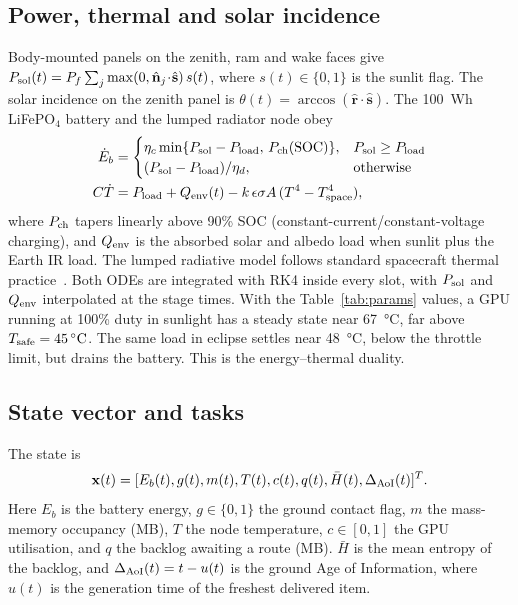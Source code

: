 \documentclass[conference]{IEEEtran}
\theoremstyle{remark}
\begin{document}
\subsection{Power, thermal and solar incidence}
Body-mounted panels on the zenith, ram and wake faces give $P_{\rm sol}(t)=P_f\sum_j\max(0,\hat{\mathbf n}_j\!\cdot\!\hat{\mathbf s})\,s(t)$, where $s(t)\in\{0,1\}$ is the sunlit flag. The solar incidence on the zenith panel is $\theta(t)=\arccos(\hat{\mathbf r}\cdot\hat{\mathbf s})$. The \SI{100}{Wh} LiFePO$_4$ battery and the lumped radiator node obey
\begin{align}
\dot E_b&=\begin{cases}\eta_c\min\{P_{\rm sol}-P_{\rm load},\,P_{\rm ch}(\mathrm{SOC})\}, & P_{\rm sol}\ge P_{\rm load}\\ (P_{\rm sol}-P_{\rm load})/\eta_d, & \text{otherwise}\end{cases}\label{eq:batt}\\
C\dot T&=P_{\rm load}+Q_{\rm env}(t)-k\,\epsilon\sigma A\,(T^4-T_{\rm space}^4),\label{eq:therm}
\end{align}
where $P_{\rm ch}$ tapers linearly above 90\% SOC (constant-current/constant-voltage charging), and $Q_{\rm env}$ is the absorbed solar and albedo load when sunlit plus the Earth IR load. The lumped radiative model follows standard spacecraft thermal practice~\cite{gilmore2002thermal}. Both ODEs are integrated with RK4 inside every slot, with $P_{\rm sol}$ and $Q_{\rm env}$ interpolated at the stage times. With the Table~\ref{tab:params} values, a GPU running at 100\% duty in sunlight has a steady state near \SI{67}{\celsius}, far above $T_{\rm safe}=\SI{45}{\celsius}$. The same load in eclipse settles near \SI{48}{\celsius}, below the throttle limit, but drains the battery. This is the energy--thermal duality.

\subsection{State vector and tasks}
The state is
\begin{equation}
\mathbf{x}(t)=[E_b(t),g(t),m(t),T(t),c(t),q(t),\bar H(t),\Delta_{\rm AoI}(t)]^T.
\end{equation}
Here $E_b$ is the battery energy, $g\in\{0,1\}$ the ground contact flag, $m$ the mass-memory occupancy (MB), $T$ the node temperature, $c\in[0,1]$ the GPU utilisation, and $q$ the backlog awaiting a route (MB). $\bar H$ is the mean entropy of the backlog, and $\Delta_{\rm AoI}(t)=t-u(t)$ is the ground Age of Information, where $u(t)$ is the generation time of the freshest delivered item.
\end{document}
